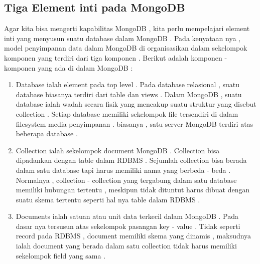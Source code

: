 \subsection{Tiga Element inti pada MongoDB}
Agar kita bisa mengerti kapabilitas MongoDB , kita perlu mempelajari element inti yang menyusun suatu database dalam MongoDB . Pada kenyataan nya , model penyimpanan data dalam MongoDB di organisasikan dalam sekelompok komponen yang terdiri dari tiga komponen . Berikut adalah komponen - komponen yang ada di dalam MongoDB :  
\begin{enumerate}
\item
	Database ialah element pada top level . Pada database relasional , suatu database biasanya terdiri dari table dan views . Dalam MongoDB , suatu database ialah wadah secara fisik yang mencakup suatu struktur yang disebut collection . Setiap database memiliki sekelompok file tersendiri di dalam filesystem media penyimpanan . biasanya , satu server MongoDB terdiri atas beberapa database .
\item
	Collection ialah sekelompok document MongoDB . Collection bisa dipadankan dengan table dalam RDBMS . Sejumlah collection bisa berada dalam satu database tapi harus memiliki nama yang berbeda - beda . Normalnya , collection - collection yang tergabung dalam satu database memiliki hubungan tertentu , meskipun tidak dituntut harus dibuat dengan suatu skema tertentu seperti hal nya table dalam RDBMS . 
\item
	Documents ialah satuan atau unit data terkecil dalam MongoDB . Pada dasar nya tersusun atas sekelompok pasangan key - value . Tidak seperti record pada RDBMS , document memiliki skema yang dinamis , maksudnya ialah document yang berada dalam satu collection tidak harus memiliki sekelompok field yang sama . 
\end{enumerate}
	
